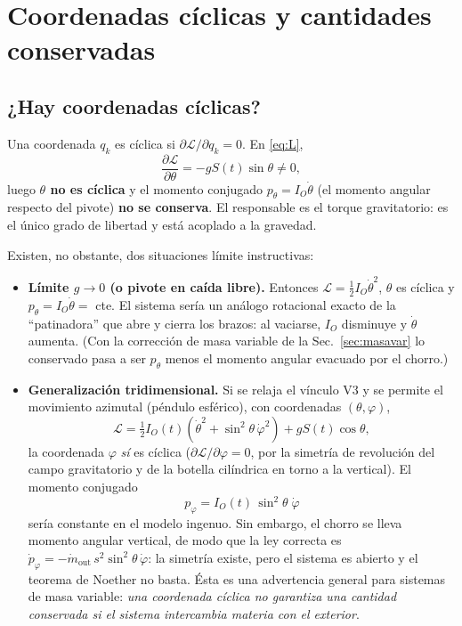 \documentclass[11pt,a4paper]{article}
\begin{document}
\section{Coordenadas cíclicas y cantidades conservadas}
\label{sec:conservadas}

\subsection{¿Hay coordenadas cíclicas?}

Una coordenada $q_k$ es cíclica si $\partial\mathcal L/\partial q_k=0$. En \eqref{eq:L},
\begin{equation}
\frac{\partial\mathcal L}{\partial\theta} = -gS(t)\sin\theta \neq 0 ,
\end{equation}
luego \textbf{$\theta$ no es cíclica} y el momento conjugado $p_\theta = I_O\dot\theta$
(el momento angular respecto del pivote) \textbf{no se conserva}. El responsable es el torque
gravitatorio: es el único grado de libertad y está acoplado a la gravedad.

Existen, no obstante, dos situaciones límite instructivas:

\begin{itemize}[leftmargin=*]
\item \textbf{Límite $g\to 0$ (o pivote en caída libre).} Entonces $\mathcal L=\tfrac12 I_O\dot\theta^2$,
$\theta$ es cíclica y $p_\theta=I_O\dot\theta=$ cte. El sistema sería un análogo rotacional exacto
de la ``patinadora'' que abre y cierra los brazos: al vaciarse, $I_O$ disminuye y $\dot\theta$
aumenta. (Con la corrección de masa variable de la Sec.~\ref{sec:masavar} lo conservado pasa a ser
$p_\theta$ menos el momento angular evacuado por el chorro.)

\item \textbf{Generalización tridimensional.} Si se relaja el vínculo V3 y se permite el movimiento
azimutal (péndulo esférico), con coordenadas $(\theta,\varphi)$,
\begin{equation}
\mathcal L = \tfrac12 I_O(t)\left(\dot\theta^2+\sin^2\!\theta\,\dot\varphi^2\right) + gS(t)\cos\theta ,
\end{equation}
la coordenada $\varphi$ \emph{sí} es cíclica ($\partial\mathcal L/\partial\varphi = 0$, por la
simetría de revolución del campo gravitatorio y de la botella cilíndrica en torno a la vertical).
El momento conjugado
\begin{equation}
p_\varphi = I_O(t)\,\sin^2\!\theta\;\dot\varphi
\end{equation}
sería constante en el modelo ingenuo. Sin embargo, el chorro se lleva momento angular vertical, de
modo que la ley correcta es
$\dot p_\varphi = -\dot m_{\text{out}}\,s^2\sin^2\!\theta\,\dot\varphi$: la simetría existe, pero
el sistema es abierto y el teorema de Noether no basta. Ésta es una advertencia general para
sistemas de masa variable: \emph{una coordenada cíclica no garantiza una cantidad conservada si el
sistema intercambia materia con el exterior}.
\end{itemize}
\end{document}
